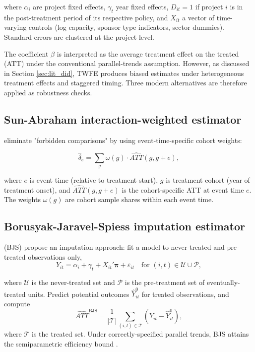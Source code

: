 where $\alpha_i$ are project fixed effects, $\gamma_t$ year fixed effects, $D_{it} = 1$ if project $i$ is in the post-treatment period of its respective policy, and $X_{it}$ a vector of time-varying controls (log capacity, sponsor type indicators, sector dummies). Standard errors are clustered at the project level.

The coefficient $\beta$ is interpreted as the average treatment effect on the treated (ATT) under the conventional parallel-trends assumption. However, as discussed in Section \ref{sec:lit_did}, TWFE produces biased estimates under heterogeneous treatment effects and staggered timing. Three modern alternatives are therefore applied as robustness checks.

\subsection{Sun-Abraham interaction-weighted estimator}

\cite{sun2021estimating} eliminate "forbidden comparisons" by using event-time-specific cohort weights:

\begin{equation}
\hat{\delta}_e = \sum_{g} \omega(g) \cdot \widehat{ATT}(g, g+e),
\label{eq:methods_sa}
\end{equation}

where $e$ is event time (relative to treatment start), $g$ is treatment cohort (year of treatment onset), and $\widehat{ATT}(g, g+e)$ is the cohort-specific ATT at event time $e$. The weights $\omega(g)$ are cohort sample shares within each event time.

\subsection{Borusyak-Jaravel-Spiess imputation estimator}

\cite{borusyak2024revisiting} (BJS) propose an imputation approach: fit a model to never-treated and pre-treated observations only,
\begin{equation}
Y_{it} = \alpha_i + \gamma_t + X_{it}' \boldsymbol{\pi} + \varepsilon_{it} \quad \text{for } (i,t) \in \mathcal{U} \cup \mathcal{P},
\label{eq:methods_bjs}
\end{equation}

where $\mathcal{U}$ is the never-treated set and $\mathcal{P}$ is the pre-treatment set of eventually-treated units. Predict potential outcomes $\hat{Y}_{it}^0$ for treated observations, and compute
\begin{equation}
\widehat{ATT}^{\text{BJS}} = \frac{1}{|\mathcal{T}|} \sum_{(i,t) \in \mathcal{T}} \left( Y_{it} - \hat{Y}_{it}^0 \right),
\label{eq:methods_bjs_att}
\end{equation}
where $\mathcal{T}$ is the treated set. Under correctly-specified parallel trends, BJS attains the semiparametric efficiency bound \cite{borusyak2024revisiting}.

